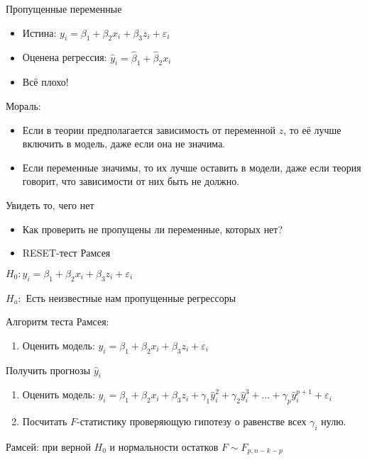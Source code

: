 \documentclass[ignorenonframetext,]{beamer}
\begin{document}
\begin{frame}{Пропущенные переменные}

\begin{itemize}
\item
  Истина: \(y_i = \beta_1 + \beta_2 x_i + \beta_3 z_i +\varepsilon_i\)
\item
  Оценена регрессия: \(\hat{y}_i=\hat{\beta}_1 + \hat{\beta}_2 x_i\)
\item
  Всё плохо!
\end{itemize}

\end{frame}

\begin{frame}{Мораль:}

\begin{itemize}
\item
  Если в теории предполагается зависимость от переменной \(z\), то её
  лучше включить в модель, даже если она не значима.
\item
  Если переменные значимы, то их лучше оставить в модели, даже если
  теория говорит, что зависимости от них быть не должно.
\end{itemize}

\end{frame}

\begin{frame}{Увидеть то, чего нет}

\begin{itemize}
\item
  Как проверить не пропущены ли переменные, которых нет?
\item
  RESET-тест Рамсея
\end{itemize}

\(H_0: y_i = \beta_1 + \beta_2 x_i + \beta_3 z_i + \varepsilon_i\)

\(H_a:\) Есть неизвестные нам пропущенные регрессоры

\end{frame}

\begin{frame}{Алгоритм теста Рамсея:}

\begin{enumerate}
\def\labelenumi{\arabic{enumi}.}
\itemsep1pt\parskip0pt
\item
  Оценить модель:
  \(y_i = \beta_1 + \beta_2 x_i + \beta_3 z_i + \varepsilon_i\)
\end{enumerate}

Получить прогнозы \(\hat{y}_i\)

\begin{enumerate}
\def\labelenumi{\arabic{enumi}.}
\setcounter{enumi}{1}
\item
  Оценить модель:
  \(y_i = \beta_1 + \beta_2 x_i + \beta_3 z_i + \gamma_1 \hat{y}^2_i + \gamma_2 \hat{y}^3_i + \ldots + \gamma_p \hat{y}_i^{p+1} + \varepsilon_i\)
\item
  Посчитать \(F\)-статистику проверяющую гипотезу о равенстве всех
  \(\gamma_i\) нулю.
\end{enumerate}

Рамсей: при верной \(H_0\) и нормальности остатков \(F\sim F_{p,n-k-p}\)

\end{frame}
\end{document}
